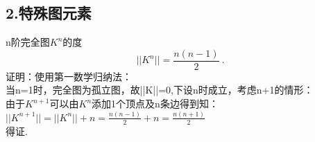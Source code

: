 \subsection{2.特殊图元素}
\begin{theorem}{n阶完全图$K^{n}$的度}
\begin{equation}
||K^{n}||=\frac{n(n-1)}{2}~.
\end{equation}
证明：使用第一数学归纳法：
\\当n=1时，完全图为孤立图，故||K||=0,下设n时成立，考虑n+1的情形：
\\由于$K^{n+1}$可以由$K^{n}$添加1个顶点及n条边得到知：
\\ $||K^{n+1}||=||K^{n}||+n=\frac{n(n-1)}{2}+n=\frac{n(n+1)}{2}$
\\得证.
\end{theorem}
